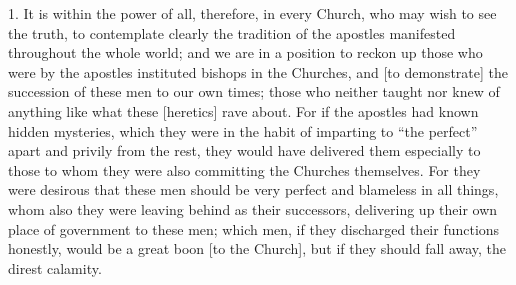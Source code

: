 
1. It is within the power of all, therefore, in every Church, who may wish to see the truth, to contemplate clearly the tradition of the apostles manifested throughout the whole world; and we are in a position to reckon up those who were by the apostles instituted bishops in the Churches, and [to demonstrate] the succession of these men to our own times; those who neither taught nor knew of anything like what these [heretics] rave about. For if the apostles had known hidden mysteries, which they were in the habit of imparting to “the perfect” apart and privily from the rest, they would have delivered them especially to those to whom they were also committing the Churches themselves. For they were desirous that these men should be very perfect and blameless in all things, whom also they were leaving behind as their successors, delivering up their own place of government to these men; which men, if they discharged their functions honestly, would be a great boon [to the Church], but if they should fall away, the direst calamity.

